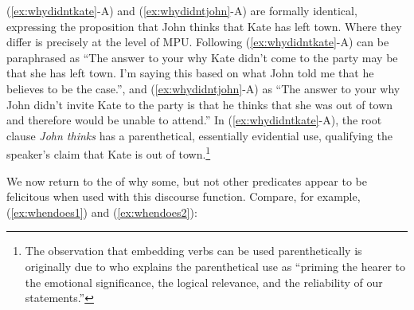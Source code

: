 \documentclass[output=paper]{langsci/langscibook}
\begin{document}
(\ref{ex:whydidntkate}-A) and (\ref{ex:whydidntjohn}-A) are formally identical, expressing the proposition that John thinks that Kate has left town. Where they differ is precisely at the level of MPU. Following \citet[1037]{Simons2007}  (\ref{ex:whydidntkate}-A) can be paraphrased as ``The answer to your  why Kate didn't come to the party may be that she has left town. I'm saying this based on what John told me that he believes to be the case.'', and (\ref{ex:whydidntjohn}-A) as ``The answer to your  why John didn't invite Kate to the party is that he thinks that she was out of town and therefore would be unable to attend.'' In (\ref{ex:whydidntkate}-A), the root clause \textit{John thinks} has a parenthetical, essentially evidential use, qualifying the speaker's claim that Kate is out of town.\footnote{The observation that embedding verbs can be used parenthetically is originally due to \citet[484]{Urmson1952} who explains the parenthetical use as ``priming the hearer to the emotional significance, the logical relevance, and the reliability of our statements.''} 

We now return to the  of why some, but not other predicates appear to be felicitous when used with this discourse function. Compare, for example, (\ref{ex:whendoes1}) and (\ref{ex:whendoes2}):



\end{document}
